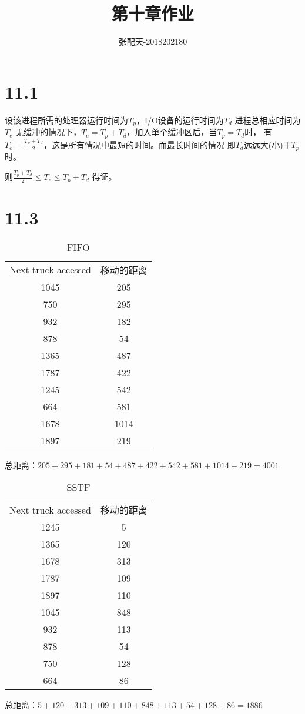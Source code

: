 \documentclass[UTF8]{ctexart}
\title{第十章作业}
\author{张配天-2018202180}
\begin{document}
    \maketitle
    \section*{11.1}
    设该进程所需的处理器运行时间为$T_p$，I/O设备的运行时间为$T_d$
    进程总相应时间为$T_e$
    无缓冲的情况下，$T_e = T_p + T_d$，加入单个缓冲区后，当$T_p = T_d$时，
    有$T_e = \frac{T_p+T_d}{2}$，这是所有情况中最短的时间。而最长时间的情况
    即$T_d$远远大(小)于$T_p$时。\par
    则$ \frac{T_p+T_d}{2} \leq T_e \leq T_p + T_d$
    得证。
    \section*{11.3}
    \begin{table}[htb]
        \centering
        \caption{FIFO}
        \begin{tabular}{cc}
            \hline
            Next truck accessed&移动的距离\\
            1045&205\\
            750&295\\
            932&182\\
            878&54\\
            1365&487\\
            1787&422\\
            1245&542\\
            664&581\\
            1678&1014\\
            1897&219\\
            \hline
        \end{tabular}
    \end{table}
    总距离：$205+295+181+54+487+422+542+581+1014+219=4001$
    \clearpage
    \begin{table}[htb]
        \centering
        \caption{SSTF}
        \begin{tabular}{cc}
            \hline
            Next truck accessed&移动的距离\\
            1245&5\\
            1365&120\\
            1678&313\\
            1787&109\\
            1897&110\\
            1045&848\\
            932&113\\
            878&54\\
            750&128\\
            664&86\\
            \hline
        \end{tabular}
    \end{table}
    总距离：$5+120+313+109+110+848+113+54+128+86=1886$
    
\end{document}
